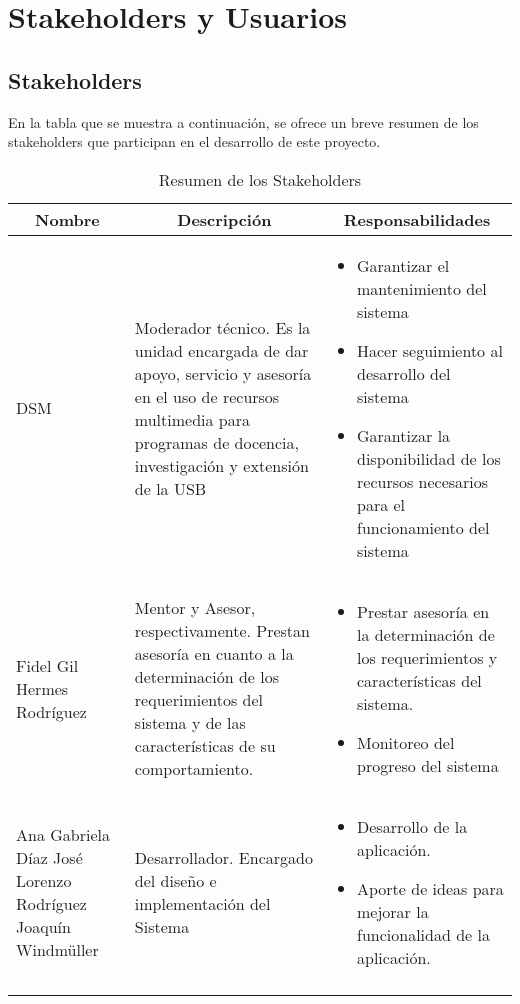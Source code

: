\chapter{Stakeholders y Usuarios}
\label{Usuarios}
\section{Stakeholders}
En la tabla que se muestra a continuación, se ofrece un breve resumen de los stakeholders que participan en el desarrollo de este proyecto.\\

\begin{longtable}{p{}p{}p{}}
	\multicolumn{1}{c}{\textbf{Nombre}} &
	\multicolumn{1}{c}{\textbf{Descripción}} &
	\multicolumn{1}{c}{\textbf{Responsabilidades}} \\ \hline
\endhead \endfoot
	DSM
	&
	Moderador técnico. Es la unidad encargada de
	dar apoyo, servicio y asesoría en el uso de recursos
	multimedia para programas de docencia,
	investigación y extensión de la USB
	&
	\vspace{-0.7cm}
		\begin{itemize}
			\item Garantizar el mantenimiento del sistema
			\item Hacer seguimiento al desarrollo del sistema
			\item Garantizar la disponibilidad de los recursos necesarios para el funcionamiento del sistema
		\end{itemize}
	\\ \hline
	
	\raggedright
	Fidel Gil \linebreak Hermes Rodríguez
	&
	Mentor y Asesor, respectivamente.
	Prestan asesoría en cuanto a la determinación de los requerimientos
	del sistema y de las características de su comportamiento.
	&
	\vspace{-0.7cm}
	\begin{itemize}
		\item Prestar asesoría en la determinación de los requerimientos y características del sistema.
		\item Monitoreo del progreso del sistema
	\end{itemize}
	\\ \hline
	
	\raggedright
	Ana Gabriela Díaz \linebreak José Lorenzo Rodríguez \linebreak Joaquín Windmüller
	&
	Desarrollador. Encargado del diseño e implementación del Sistema
	&
	\vspace{-0.7cm}
	\begin{itemize}
		\item Desarrollo de la aplicación.
		\item Aporte de ideas para mejorar la funcionalidad de la aplicación.
	\end{itemize}	
	\\ \hline
\caption{Resumen de los Stakeholders} \label{tab:stakeholders} \\  
\end{longtable}


